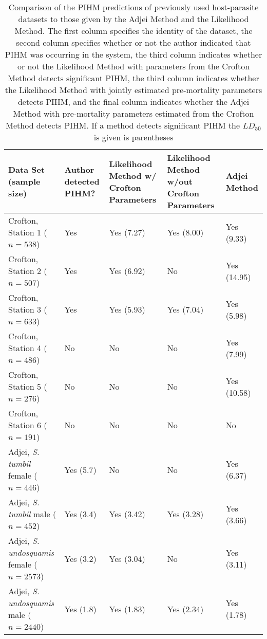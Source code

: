 \documentclass[12pt, a4paper]{article}
\begin{document}
\renewcommand{\arraystretch}{1.2}
\begin{sidewaystable}

    \caption{Comparison of the PIHM predictions of previously used host-parasite datasets to those given by the Adjei Method and the Likelihood Method. The first column specifies the identity of the dataset, the second column specifies whether or not the author indicated that PIHM was occurring in the system, the third column indicates whether or not the Likelihood Method with parameters from the Crofton Method detects significant PIHM, the third column indicates whether the Likelihood Method with jointly estimated pre-mortality parameters detects PIHM, and the final column indicates whether the Adjei Method with pre-mortality parameters estimated from the Crofton Method detects PIHM.  If a method detects significant PIHM the $LD_{50}$ is given is parentheses}

    \centering
    \begin{tabular}{l l p{3cm} p{3cm} l}

    \hline\hline
    Data Set (sample size) & Author detected PIHM? & Likelihood Method w/ Crofton Parameters & Likelihood Method w/out Crofton Parameters & Adjei Method \\

    \hline
    Crofton, Station 1 ($n=538$) & Yes & Yes (7.27) & Yes (8.00) & Yes (9.33) \\
    Crofton, Station 2 ($n=507$) & Yes & Yes (6.92) & No & Yes (14.95)\\
    Crofton, Station 3 ($n=633$) & Yes & Yes (5.93) & Yes (7.04) & Yes (5.98) \\
    Crofton, Station 4 ($n=486$) & No & No & No & Yes (7.99) \\
    Crofton, Station 5 ($n=276$) & No & No & No & Yes (10.58) \\
    Crofton, Station 6 ($n=191$) & No & No & No & No \\
    Adjei, \emph{S. tumbil} female ($n=446$) & Yes (5.7) & No  & No   & Yes (6.37) \\
    Adjei, \emph{S. tumbil} male ($n=452$) & Yes (3.4) & Yes (3.42) & Yes (3.28) & Yes (3.66)  \\
    Adjei, \emph{S. undosquamis} female ($n=2573$) & Yes (3.2) & Yes (3.04) & No  & Yes (3.11) \\
    Adjei, \emph{S. undosquamis} male ($n=2440$) & Yes (1.8) & Yes (1.83) & Yes (2.34) & Yes (1.78) \\


    \end{tabular}
    \label{table:pihm}

\end{sidewaystable}
\end{document}
